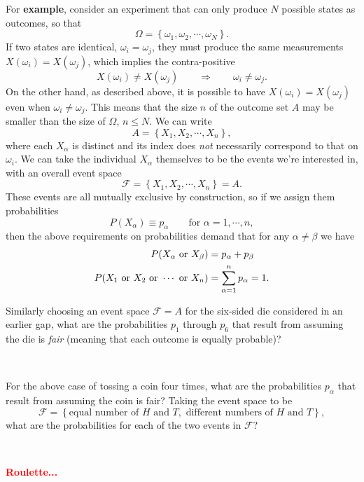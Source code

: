 \documentclass[12 pt]{article}
\newcommand{\cF}{\ensuremath{\mathcal F} }
\newcommand{\al}{\ensuremath{\alpha} }
\newcommand{\be}{\ensuremath{\beta} }
\newcommand{\om}{\ensuremath{\omega} }
\newcommand{\Om}{\ensuremath{\Omega} }
\newcommand{\Lra}{\ensuremath{\Longrightarrow} }
\newcommand{\TODO}[1]{\textcolor{red}{\textbf{#1}}}
\begin{document}
For \textbf{example}, consider an experiment that can only produce $N$ possible states as outcomes, so that
\begin{equation*}
  \Om = \left\{\om_1, \om_2, \cdots, \om_N\right\}.
\end{equation*}
If two states are identical, $\om_i = \om_j$, they must produce the same measurements $X(\om_i) = X(\om_j)$, which implies the contra-positive
\begin{equation*}
  X(\om_i) \ne X(\om_j) \qquad \Lra \qquad \om_i \ne \om_j.
\end{equation*}
On the other hand, as described above, it is possible to have $X(\om_i) = X(\om_j)$ even when $\om_i \ne \om_j$.
This means that the size $n$ of the outcome set $A$ may be smaller than the size of $\Om$, $n \leq N$.
We can write
\begin{equation*}
  A = \left\{X_1, X_2, \cdots, X_n\right\},
\end{equation*}
where each $X_{\al}$ is distinct and its index does \textit{not} necessarily correspond to that on $\om_i$.
We can take the individual $X_{\al}$ themselves to be the events we're interested in, with an overall event space
\begin{equation*}
  \cF = \left\{X_1, X_2, \cdots, X_n\right\} = A.
\end{equation*}
These events are all mutually exclusive by construction, so if we assign them probabilities
\begin{equation*}
  P(X_{\al}) \equiv p_{\al} \qquad \mbox{for } \al = 1, \cdots, n,
\end{equation*}
then the above requirements on probabilities demand that for any $\al \ne \be$ we have
\begin{align*}
  P(X_{\al} \mbox{ or } X_{\be}) & = p_{\al} + p_{\be} \\
  P(X_1 \hbox{ or } X_2 \hbox{ or } \cdots \mbox{ or } X_n) & = \sum_{\al = 1}^n p_{\al} = 1.
\end{align*}

Similarly choosing an event space $\cF = A$ for the six-sided die considered in an earlier gap, what are the probabilities $p_1$ through $p_6$ that result from assuming the die is \textit{fair} (meaning that each outcome is equally probable)?
\begin{mdframed}
  \ \\[100 pt]
\end{mdframed}
\newpage %
\noindent
For the above case of tossing a coin four times, what are the probabilities $p_{\al}$ that result from assuming the coin is fair?
Taking the event space to be
\begin{equation*}
  \cF = \left\{\mbox{equal number of } H \mbox{ and } T, \mbox{ different numbers of } H \mbox{ and } T\right\},
\end{equation*}
what are the probabilities for each of the two events in $\cF$?
\begin{mdframed}
  \ \\[100 pt]
\end{mdframed}
\TODO{Roulette...}
\end{document}
